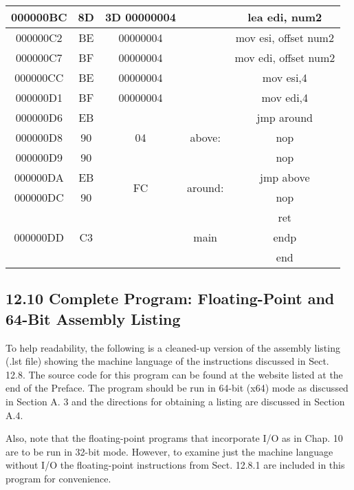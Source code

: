 \documentclass[10pt]{article}
\begin{document}
\begin{center}
\begin{tabular}{|c|c|c|c|c|}
\hline
000000BC & 8D & 3D 00000004 &  & lea edi, num2 \\
\hline
000000C2 & BE & 00000004 &  & mov esi, offset num2 \\
\hline
000000C7 & BF & 00000004 &  & mov edi, offset num2 \\
\hline
000000CC & BE & 00000004 &  & mov esi,4 \\
\hline
000000D1 & BF & 00000004 &  & mov edi,4 \\
\hline
000000D6 & EB & \multirow[t]{3}{*}{04} & \multirow{3}{*}{above:} & jmp around \\
\hline
000000D8 & 90 &  &  & nop \\
\hline
000000D9 & 90 &  &  & nop \\
\hline
000000DA & EB & \multirow[t]{2}{*}{FC} & \multirow[b]{2}{*}{around:} & jmp above \\
\hline
000000DC & 90 &  &  & nop \\
\hline
\multirow[t]{3}{*}{000000DD} & \multirow[t]{3}{*}{C3} &  &  & ret \\
\hline
 &  &  & main & endp \\
\hline
 &  &  &  & end \\
\hline
\end{tabular}
\end{center}

\subsection*{12.10 Complete Program: Floating-Point and 64-Bit Assembly Listing}
To help readability, the following is a cleaned-up version of the assembly listing (.lst file) showing the machine language of the instructions discussed in Sect. 12.8. The source code for this program can be found at the website listed at the end of the Preface. The program should be run in 64-bit (x64) mode as discussed in Section A. 3 and the directions for obtaining a listing are discussed in Section A.4.

Also, note that the floating-point programs that incorporate I/O as in Chap. 10 are to be run in 32-bit mode. However, to examine just the machine language without I/O the floating-point instructions from Sect. 12.8.1 are included in this program for convenience.
\end{document}
